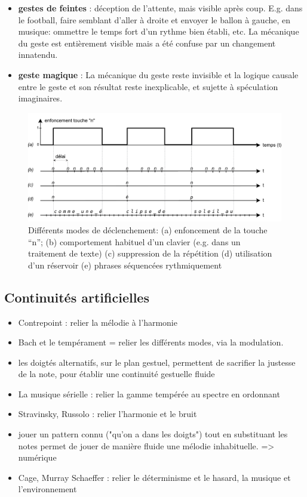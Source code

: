 \vspace{-1em}
\begin{itemize}[noitemsep]
\item \textbf{gestes de feintes} : déception de l'attente, mais visible après coup. E.g. dans le football, faire semblant d'aller à droite et envoyer le ballon à gauche, en musique: ommettre le temps fort d'un rythme bien établi, etc. La mécanique du geste est entièrement visible mais a été confuse par un changement innatendu.
\item \textbf{geste magique} : La mécanique du geste reste invisible et la logique causale entre le geste et son résultat reste inexplicable, et sujette à spéculation imaginaires.
\end{itemize}


\begin{figure}[!htbp]
	\includegraphics[width=\textwidth]{gfx/03_gesture/key_modes.pdf}
	\caption{Différents modes de déclenchement: (a) enfoncement de la touche ``n''; (b) comportement habituel d'un clavier (e.g. dans un traitement de texte) (c) suppression de la répétition (d) utilisation d'un réservoir (e) phrases séquencées rythmiquement}
	\label{fig:gesture:triggering_modes}
\end{figure}


\subsection{Continuités artificielles}

\vspace{-1em}
\begin{itemize}[noitemsep]
\item Contrepoint : relier la mélodie à l'harmonie 
\item Bach et le tempérament = relier les différents modes, via la modulation.
\item les doigtés alternatifs, sur le plan gestuel, permettent de sacrifier la justesse de la note, pour établir une continuité gestuelle fluide
\item La musique sérielle : relier la gamme tempérée au spectre en ordonnant 
\item Stravinsky, Russolo : relier l’harmonie et le bruit 
\item jouer un pattern connu ("qu'on a dans les doigts") tout en substituant les notes permet de jouer de manière fluide une mélodie inhabituelle. => numérique
\item Cage, Murray Schaeffer : relier le déterminisme et le hasard, la musique et l’environnement 
\end{itemize}

